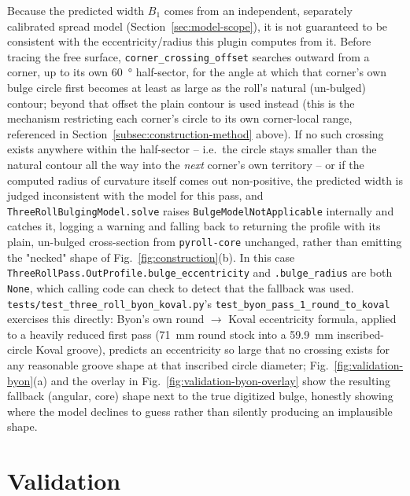 \documentclass[11pt]{PyRollDocs}
\begin{document}
    Because the predicted width $B_1$ comes from an independent, separately calibrated
    spread model (Section~\ref{sec:model-scope}), it is not guaranteed to be
    consistent with the eccentricity/radius this plugin computes from it. Before
    tracing the free surface, \texttt{corner\_crossing\_offset} searches outward from
    a corner, up to its own \SI{60}{\degree} half-sector, for the angle at which that
    corner's own bulge circle first becomes at least as large as the roll's natural
    (un-bulged) contour; beyond that offset the plain contour is used instead (this is
    the mechanism restricting each corner's circle to its own corner-local range,
    referenced in Section~\ref{subsec:construction-method} above). If no such crossing
    exists anywhere within the half-sector -- i.e.\ the circle stays smaller than the
    natural contour all the way into the \emph{next} corner's own territory -- or if
    the computed radius of curvature itself comes out non-positive, the predicted
    width is judged inconsistent with the model for this pass, and
    \texttt{ThreeRollBulgingModel.solve} raises
    \texttt{BulgeModelNotApplicable} internally and catches it, logging a warning and
    falling back to returning the profile with its plain, un-bulged cross-section from
    \texttt{pyroll-core} unchanged, rather than emitting the "necked" shape of
    Fig.~\ref{fig:construction}(b). In this case
    \texttt{ThreeRollPass.OutProfile.bulge\_eccentricity} and \texttt{.bulge\_radius}
    are both \texttt{None}, which calling code can check to detect that the fallback
    was used. \texttt{tests/test\_three\_roll\_byon\_koval.py}'s
    \texttt{test\_byon\_pass\_1\_round\_to\_koval} exercises this directly: Byon's own
    round $\to$ Koval eccentricity formula, applied to a heavily reduced first pass
    (\SI{71}{mm} round stock into a \SI{59.9}{mm} inscribed-circle Koval groove),
    predicts an eccentricity so large that no crossing exists for any reasonable
    groove shape at that inscribed circle diameter; Fig.~\ref{fig:validation-byon}(a)
    and the overlay in Fig.~\ref{fig:validation-byon-overlay} show the resulting
    fallback (angular, core) shape next to the true digitized bulge, honestly showing
    where the model declines to guess rather than silently producing an implausible
    shape.

    \section{Validation}\label{sec:validation}
\end{document}
